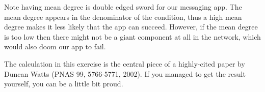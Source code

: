 Note having mean degree is double edged sword for our messaging app. The mean degree appears in the denominator of the condition, thus a high mean degree makes it less likely that the app can succeed. However, if the mean degree is too low then there might not be a giant component at all in the network, which would also doom our app to fail. 

The calculation in this exercise is the central piece of a highly-cited paper by Duncan Watts 
(PNAS 99, 5766-5771, 2002). If you managed to get the result yourself, you can be a little bit proud. 
